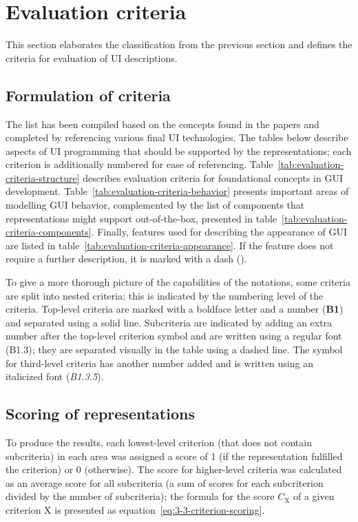 \section{Evaluation criteria}\label{sec:evaluation-criteria}

This section elaborates the classification from the previous section and defines the criteria for evaluation of UI descriptions.

\subsection{Formulation of criteria}\label{subsec:formulation-of-criteria}
The list has been compiled based on the concepts found in the papers and completed by referencing various final UI technologies.
The tables below describe aspects of UI programming that should be supported by the representations;
each criterion is additionally numbered for ease of referencing.
Table~\ref{tab:evaluation-criteria-structure} describes evaluation criteria for foundational concepts in GUI development.
Table~\ref{tab:evaluation-criteria-behavior} presents important areas of modelling GUI behavior, complemented by the list of components that representations might support out-of-the-box, presented in table~\ref{tab:evaluation-criteria-components}.
Finally, features used for describing the appearance of GUI are listed in table~\ref{tab:evaluation-criteria-appearance}.
If the feature does not require a further description, it is marked with a dash (\textemdash).

To give a more thorough picture of the capabilities of the notations, some criteria are split into nested criteria;
this is indicated by the numbering level of the criteria.
Top-level criteria are marked with a boldface letter and a number (\textbf{B1}) and separated using a solid line.
Subcriteria are indicated by adding an extra number after the top-level criterion symbol and are written using a regular font (B1.3);
they are separated visually in the table using a dashed line.
The symbol for third-level criteria has another number added and is written using an italicized font (\textit{B1.3.5}).

\subsection{Scoring of representations}\label{subsec:scoring-of-representations}
To produce the results, each lowest-level criterion (that does not contain subcriteria) in each area was assigned a score of 1 (if the representation fulfilled the criterion) or 0 (otherwise).
The score for higher-level criteria was calculated as an average score for all subcriteria (a sum of scores for each subcriterion divided by the number of subcriteria);
the formula for the score $C_\text{X}$ of a given criterion X is presented as  equation~\ref{eq:3-3-criterion-scoring}.

